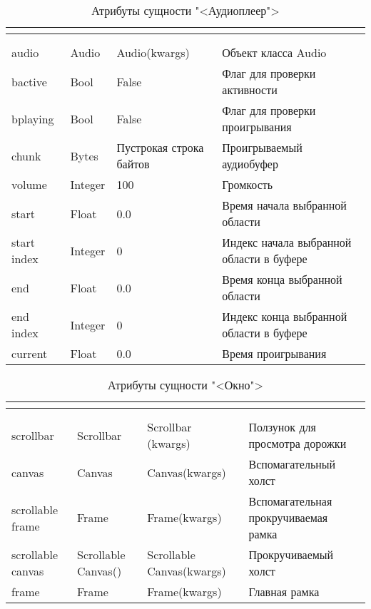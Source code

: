 \begin{xltabular}{\textwidth}{|p{2cm}|p{2cm}|l|X|}
	\caption{Атрибуты сущности "<Аудиоплеер">}\\ \hline
	\label{news2:table}
	 &  &  &  \\ \hline
	 &  &  &  \\ \hline
	\endfirsthead
	 &  &  &  \\ \hline
	\finishhead
	audio & Audio & Audio(kwargs) & Объект класса Audio \\ \hline 
	bactive & Bool & False & Флаг для проверки активности \\ \hline 
	bplaying & Bool & False & Флаг для проверки проигрывания \\ \hline 
	chunk & Bytes & Пустрокая строка байтов & Проигрываемый аудиобуфер \\ \hline 
	volume & Integer & 100 & Громкость \\ \hline 
	start & Float & 0.0 & Время начала выбранной области \\ \hline 
	start index & Integer & 0 & Индекс начала выбранной области в буфере \\ \hline 
	end & Float & 0.0 & Время конца выбранной области \\ \hline 
	end index & Integer & 0 & Индекс конца выбранной области в буфере \\ \hline 
	current & Float & 0.0 & Время проигрывания
\end{xltabular}

\begin{xltabular}{\textwidth}{|p{2cm}|p{2cm}|l|X|}
	\caption{Атрибуты сущности "<Окно">}\\ \hline
	\label{news3:table}
	 &  &  &  \\ \hline
	 &  &  &  \\ \hline
	\endfirsthead
	 &  &  &  \\ \hline
	\finishhead
	scrollbar & Scrollbar & Scrollbar (kwargs) & Ползунок для просмотра дорожки \\ \hline 
	canvas & Canvas & Canvas(kwargs) & Вспомагательный холст \\ \hline 
	scrollable frame & Frame & Frame(kwargs) & Вспомагательная прокручиваемая рамка \\ \hline 
	scrollable canvas & Scrollable Canvas() & Scrollable Canvas(kwargs) & Прокручиваемый холст \\ \hline 
	frame & Frame & Frame(kwargs) & Главная рамка
\end{xltabular}

